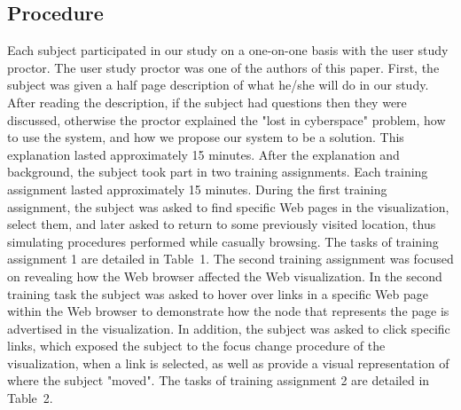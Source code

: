 \documentclass[10pt,psfig]{article}
\begin{document}
{\begin{table}[t]
\label{table:assign2}
\end{table}

\subsection{Procedure}

Each subject participated in our study on a one-on-one basis with the user study proctor.  The user study proctor was one of the authors of this paper.
First, the subject was given a half page description of what he/she will do in our study.
After reading the description, if the subject had questions then they were discussed, otherwise the proctor explained the "lost in cyberspace" problem, how to use the system, and how we propose our system to be a solution.  This explanation lasted approximately 15 minutes.  After the explanation and background, the subject took part in two training assignments.
Each training assignment lasted approximately 15 minutes.
During the first training assignment, the subject was asked to find specific Web pages in the visualization, select them, and later asked to return to some previously visited location, thus simulating procedures performed while casually browsing.
The tasks of training assignment 1 are detailed in Table~1.
The second training assignment was focused on revealing how the Web browser affected the Web visualization.
In the second training task the subject was asked to hover over links in a specific Web page within the Web browser to demonstrate how the node that represents the page is advertised in the visualization.
In addition, the subject was asked to click specific links, which exposed the subject to the focus change procedure of the visualization, when a link is selected, as well as provide a visual representation of where the subject "moved".
The tasks of training assignment 2 are detailed in Table~2.

}
\end{document}
